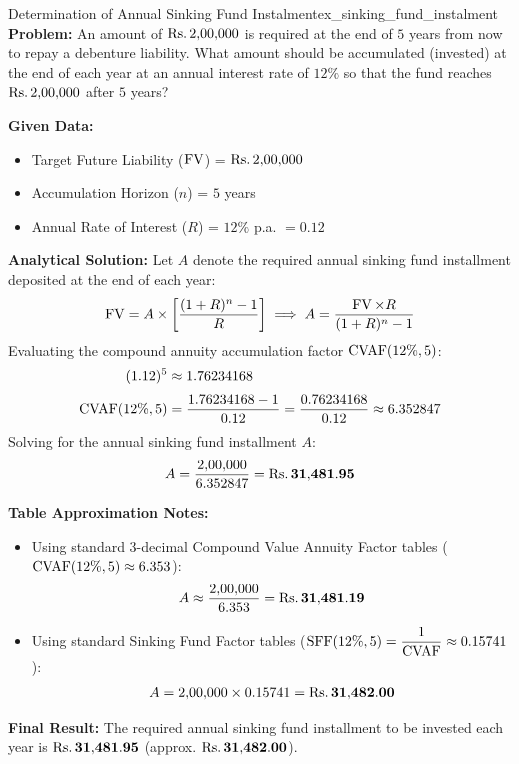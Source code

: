 \begin{example}{Determination of Annual Sinking Fund Instalment}{ex_sinking_fund_instalment}
\textbf{Problem:}
An amount of $\text{Rs.}\, 2{,}00{,}000$ is required at the end of $5$ years from now to repay a debenture liability. What amount should be accumulated (invested) at the end of each year at an annual interest rate of $12\%$ so that the fund reaches $\text{Rs.}\, 2{,}00{,}000$ after $5$ years?

\tcbline
\textbf{Given Data:}
\begin{itemize}[noitemsep]
    \item Target Future Liability ($\operatorname{FV}$) = $\text{Rs.}\, 2{,}00{,}000$
    \item Accumulation Horizon ($n$) = $5$ years
    \item Annual Rate of Interest ($R$) = $12\%$ p.a. $= 0.12$
\end{itemize}

\textbf{Analytical Solution:}
Let $A$ denote the required annual sinking fund installment deposited at the end of each year:
\begin{equation*}
    \operatorname{FV} = A \times \left[ \frac{(1 + R)^n - 1}{R} \right] \implies A = \frac{\operatorname{FV} \times R}{(1 + R)^n - 1}
\end{equation*}
Evaluating the compound annuity accumulation factor $\operatorname{CVAF}(12\%, 5)$:
\begin{align*}
    (1.12)^5 &\approx 1.76234168 \\[0.3em]
    \operatorname{CVAF}(12\%, 5) &= \frac{1.76234168 - 1}{0.12} = \frac{0.76234168}{0.12} \approx 6.352847
\end{align*}
Solving for the annual sinking fund installment $A$:
\begin{equation*}
    A = \frac{2{,}00{,}000}{6.352847} = \mathbf{\text{Rs.}\, 31{,}481.95}
\end{equation*}

\textbf{Table Approximation Notes:}
\begin{itemize}[leftmargin=*]
    \item Using standard 3-decimal Compound Value Annuity Factor tables ($\operatorname{CVAF}(12\%, 5) \approx 6.353$):
    \begin{equation*}
        A \approx \frac{2{,}00{,}000}{6.353} = \mathbf{\text{Rs.}\, 31{,}481.19}
    \end{equation*}
    \item Using standard Sinking Fund Factor tables ($\text{SFF}(12\%, 5) = \dfrac{1}{\operatorname{CVAF}} \approx 0.15741$):
    \begin{equation*}
        A = 2{,}00{,}000 \times 0.15741 = \mathbf{\text{Rs.}\, 31{,}482.00}
    \end{equation*}
\end{itemize}

\textbf{Final Result:}
The required annual sinking fund installment to be invested each year is $\mathbf{\text{Rs.}\, 31{,}481.95}$ (approx. $\mathbf{\text{Rs.}\, 31{,}482.00}$).
\end{example}

